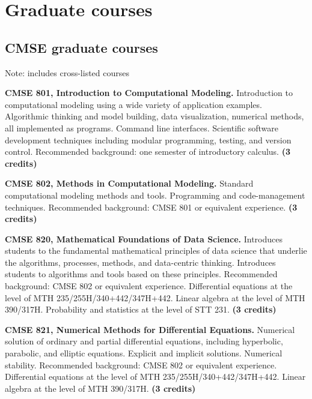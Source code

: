 \section{Graduate courses}
\label{sec:courses}

\subsection{CMSE graduate courses}

Note: includes cross-listed courses


\noindent\textbf{CMSE 801, Introduction to Computational Modeling.}  Introduction to computational modeling using a wide variety of application examples. Algorithmic thinking and model building, data visualization, numerical methods, all implemented as programs. Command line interfaces. Scientific software development techniques including modular programming, testing, and version control.  Recommended background: one semester of introductory calculus.  \textbf{(3 credits)}  
\vspace{3mm}

\noindent\textbf{CMSE 802, Methods in Computational Modeling.}  Standard computational modeling methods and tools. Programming and code-management techniques.  Recommended background:  CMSE 801 or equivalent experience.  \textbf{(3 credits)}  

\vspace{3mm}
\noindent\textbf{CMSE 820, Mathematical Foundations of Data Science.}  Introduces students to the fundamental mathematical principles of data science that underlie the algorithms, processes, methods, and data-centric thinking. Introduces students to algorithms and tools based on these principles.  Recommended background:  CMSE 802 or equivalent experience.  Differential equations at the level of MTH 235/255H/340+442/347H+442.  Linear algebra at the level of MTH 390/317H.  Probability and statistics at the level of STT 231.  \textbf{(3 credits)}

\vspace{3mm}
\noindent\textbf{CMSE 821, Numerical Methods for Differential Equations.}
Numerical solution of ordinary and partial differential equations, including hyperbolic, parabolic, and elliptic equations. Explicit and implicit solutions. Numerical stability.
Recommended background:  CMSE 802 or equivalent experience.  Differential equations at the level of MTH 235/255H/340+442/347H+442.  Linear algebra at the level of MTH 390/317H.  \textbf{(3 credits)}

